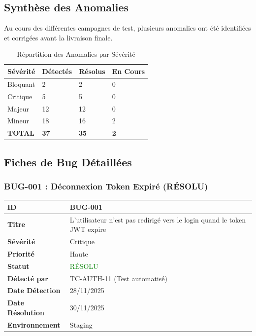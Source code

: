 \documentclass[12pt,a4paper]{article}
\begin{document}
\subsection{Synthèse des Anomalies}
Au cours des différentes campagnes de test, plusieurs anomalies ont été identifiées et corrigées avant la livraison finale.

\begin{table}[H]
\centering
\begin{tabularx}{\textwidth}{|l|l|l|X|}
    \hline
    \textbf{Sévérité} & \textbf{Détectés} & \textbf{Résolus} & \textbf{En Cours} \\ \hline
    Bloquant & 2 & 2 & 0 \\ \hline
    Critique & 5 & 5 & 0 \\ \hline
    Majeur & 12 & 12 & 0 \\ \hline
    Mineur & 18 & 16 & 2 \\ \hline
    \textbf{TOTAL} & \textbf{37} & \textbf{35} & \textbf{2} \\ \hline
\end{tabularx}
\caption{Répartition des Anomalies par Sévérité}
\end{table}

\subsection{Fiches de Bug Détaillées}

\subsubsection{BUG-001 : Déconnexion Token Expiré (RÉSOLU)}

\begin{tabularx}{\textwidth}{|l|X|}
    \hline
    \textbf{ID} & BUG-001 \\ \hline
    \textbf{Titre} & L'utilisateur n'est pas redirigé vers le login quand le token JWT expire \\ \hline
    \textbf{Sévérité} & Critique \\ \hline
    \textbf{Priorité} & Haute \\ \hline
    \textbf{Statut} & \textcolor{green}{RÉSOLU} \\ \hline
    \textbf{Détecté par} & TC-AUTH-11 (Test automatisé) \\ \hline
    \textbf{Date Détection} & 28/11/2025 \\ \hline
    \textbf{Date Résolution} & 30/11/2025 \\ \hline
    \textbf{Environnement} & Staging \\ \hline
\end{tabularx}
\end{document}
